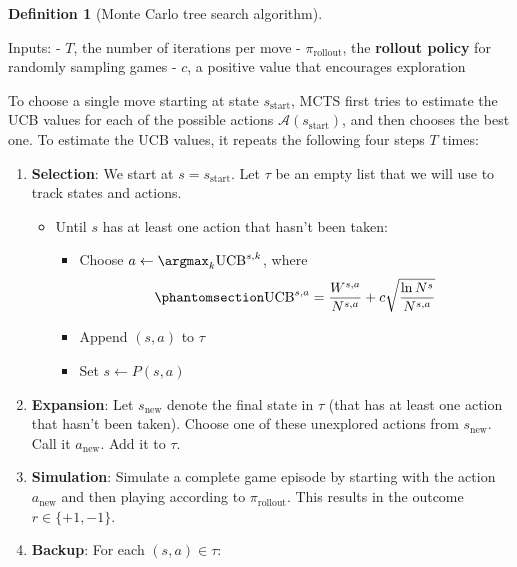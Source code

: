 \documentclass[
  letterpaper,
  DIV=11,
  numbers=noendperiod]{scrreprt}
\providecommand{\tightlist}{%
  \setlength{\itemsep}{0pt}\setlength{\parskip}{0pt}}\usepackage{longtable,booktabs,array}
\theoremstyle{plain}
\theoremstyle{plain}
\theoremstyle{definition}
\theoremstyle{definition}
\newtheorem{definition}{Definition}[chapter]
\theoremstyle{remark}
\begin{document}
\begin{definition}[Monte Carlo tree search
algorithm]\protect\hypertarget{def-mcts-algorithm}{}\label{def-mcts-algorithm}

Inputs: - \(T\), the number of iterations per move -
\(\pi_{\text{rollout}}\), the \textbf{rollout policy} for randomly
sampling games - \(c\), a positive value that encourages exploration

To choose a single move starting at state \(s_{\text{start}}\), MCTS
first tries to estimate the UCB values for each of the possible actions
\(\mathcal{A}(s_\text{start})\), and then chooses the best one. To
estimate the UCB values, it repeats the following four steps \(T\)
times:

\begin{enumerate}
\def\labelenumi{\arabic{enumi}.}
\tightlist
\item
  \textbf{Selection}: We start at \(s = s_{\text{start}}\). Let \(\tau\)
  be an empty list that we will use to track states and actions.

  \begin{itemize}
  \tightlist
  \item
    Until \(s\) has at least one action that hasn't been taken:

    \begin{itemize}
    \tightlist
    \item
      Choose \(a \gets \argmax_k \text{UCB}^{s, k}\), where
      \begin{equation}\phantomsection\label{eq-ucb-tree}{
      \text{UCB}^{s, a} = \frac{W^{s, a}}{N^{s, a}} + c \sqrt{\frac{\ln N^s}{N^{s, a}}}
      }\end{equation}
    \item
      Append \((s, a)\) to \(\tau\)
    \item
      Set \(s \gets P(s, a)\)
    \end{itemize}
  \end{itemize}
\item
  \textbf{Expansion}: Let \(s_\text{new}\) denote the final state in
  \(\tau\) (that has at least one action that hasn't been taken). Choose
  one of these unexplored actions from \(s_\text{new}\). Call it
  \(a_{\text{new}}\). Add it to \(\tau\).
\item
  \textbf{Simulation}: Simulate a complete game episode by starting with
  the action \(a_{\text{new}}\) and then playing according to
  \(\pi_\text{rollout}\). This results in the outcome
  \(r \in \{ +1, -1 \}\).
\item
  \textbf{Backup}: For each \((s, a) \in \tau\):


\end{enumerate}
\end{definition}
\end{document}
